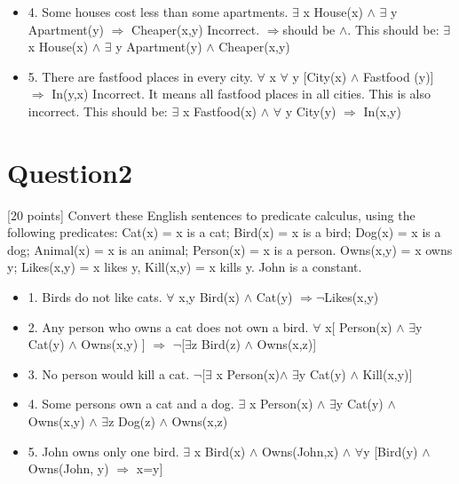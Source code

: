 \documentclass{article}
\begin{document}
\begin{itemize}
    \item 4.    Some houses cost less than some apartments. \newline
    $\exists$ x House(x) $\wedge$ $\exists$ y Apartment(y) $\Rightarrow$ Cheaper(x,y)\newline
    \break
    Incorrect. $\Rightarrow$should be $\wedge$. This should be:\newline
    $\exists$ x House(x) $\wedge$ $\exists$ y Apartment(y) $\wedge$ Cheaper(x,y)
    \item 5.    There are fastfood places in every city. \newline
    $\forall$ x $\forall$ y [City(x) $\wedge$ Fastfood (y)] $\Rightarrow$ In(y,x)\newline
    \break
    Incorrect. It means all fastfood places in all cities. This is also incorrect.
    This should be:\newline
    $\exists$ x Fastfood(x) $\wedge$ $\forall$ y City(y) $\Rightarrow$ In(x,y)

\end{itemize}

\section{Question2}
[20 points] Convert these English sentences to predicate calculus, using the following predicates: Cat(x) = x is a cat; Bird(x) = x is a bird; Dog(x) = x is a dog; Animal(x) = x is an animal; Person(x) = x is a person. Owns(x,y) = x owns y; Likes(x,y) = x likes y, Kill(x,y) = x kills y. John is a constant.
\begin{itemize}
    
\item 1.    Birds do not like cats.\newline
$\forall$ x,y Bird(x) $\wedge$ Cat(y) $\Rightarrow$$\neg$Likes(x,y)
\item 2.    Any person who owns a cat does not own a bird.\newline
$\forall$ x[ Person(x) $\wedge$ $\exists$y Cat(y) $\wedge$ Owns(x,y) ] $\Rightarrow$ $\neg$[$\exists$z Bird(z) $\wedge$ Owns(x,z)]
\item 3.    No person would kill a cat.\newline
$\neg$[$\exists$ x Person(x)$\wedge$ $\exists$y Cat(y) $\wedge$ Kill(x,y)]
\item 4.    Some persons own a cat and a dog.\newline
$\exists$ x Person(x) $\wedge$ $\exists$y Cat(y) $\wedge$ Owns(x,y) $\wedge$ $\exists$z Dog(z) $\wedge$ Owns(x,z)
\item 5.    John owns only one bird.\newline
$\exists$ x Bird(x) $\wedge$ Owns(John,x) $\wedge$ $\forall$y [Bird(y) $\wedge$ Owns(John, y)  $\Rightarrow$ x=y]
\end{itemize}
\end{document}

